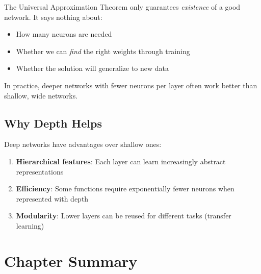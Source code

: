 \begin{importantbox}
The Universal Approximation Theorem only guarantees \textit{existence} of a good network. It says nothing about:
\begin{itemize}
    \item How many neurons are needed
    \item Whether we can \textit{find} the right weights through training
    \item Whether the solution will generalize to new data
\end{itemize}

In practice, deeper networks with fewer neurons per layer often work better than shallow, wide networks.
\end{importantbox}

\subsection{Why Depth Helps}

Deep networks have advantages over shallow ones:

\begin{enumerate}
    \item \textbf{Hierarchical features}: Each layer can learn increasingly abstract representations
    \item \textbf{Efficiency}: Some functions require exponentially fewer neurons when represented with depth
    \item \textbf{Modularity}: Lower layers can be reused for different tasks (transfer learning)
\end{enumerate}


\section{Chapter Summary}

